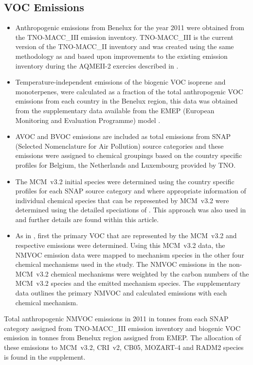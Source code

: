 \subsection{VOC Emissions} \label{ss:VOC_emissions}
\begin{itemize}
    \item Anthropogenic emissions from Benelux for the year 2011 were obtained from the TNO-MACC\_III emission inventory. TNO-MACC\_III is the current version of the TNO-MACC\_II inventory and was created using the same methodology as \citet{Kuenen:2014} and based upon improvements to the existing emission inventory during the AQMEII-2 exercies described in \citet{Pouliot:2015}. 
    \item Temperature-independent emissions of the biogenic VOC isoprene and monoterpenes, were calculated as a fraction of the total anthropogenic VOC emissions from each country in the Benelux region, this data was obtained from the supplementary data available from the EMEP (European Monitoring and Evaluation Programme) model \citep{Simpson:2012}.
    \item AVOC and BVOC emissions are included as total emissions from SNAP (Selected Nomenclature for Air Pollution) source categories and these emissions were assigned to chemical groupings based on the country specific profiles for Belgium, the Netherlands and Luxembourg provided by TNO.
    \item The MCM~v3.2 initial species were determined using the country specific profiles for each SNAP source category and where appropriate information of individual chemical species that can be represented by MCM~v3.2 were determined using the detailed speciations of \citet{Passant:2002}. This approach was also used in \citet{vonSchneidemesser:2015} and further details are found within this article.
    \item As in \citet{vonSchneidemesser:2015}, first the primary VOC that are represented by the MCM~v3.2 and respective emissions were determined. Using this MCM~v3.2 data, the NMVOC emission data were mapped to mechanism species in the other four chemical mechanisms used in the study. The NMVOC emissions in the non-MCM~v3.2 chemical mechanisms were weighted by the carbon numbers of the MCM~v3.2 species and the emitted mechanism species. The supplementary data outlines the primary NMVOC and calculated emissions with each chemical mechanism.
\end{itemize}
{%
    \renewcommand{\arraystretch}{1.1}%
    \begin{table}%
        \centering%
        \caption{Total anthropogenic NMVOC emissions in 2011 in tonnes from each SNAP category assigned from TNO-MACC\_III emission inventory and biogenic VOC emission in tonnes from Benelux region assigned from EMEP. The allocation of these emissions to MCM~v3.2, CRI~v2, CB05, MOZART-4 and RADM2 species is found in the supplement.}%
        
    \end{table}%
}
{
    \begin{landscape}%
        \centering%
    \end{landscape}%
}


